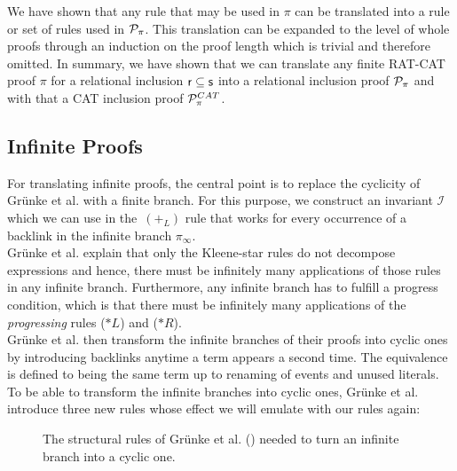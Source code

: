 \documentclass[a4paper,twoside,12pt, english]{article}
\begin{document}
We have shown that any rule that may be used in $\pi$ can be translated into a rule or set of rules used in $\mathcal{P}_\pi$. This translation can be expanded to the level of whole proofs through an induction on the proof length which is trivial and therefore omitted.
In summary, we have shown that we can translate any finite RAT-CAT proof $\pi$ for a relational inclusion $\textsf{\upshape r} \subseteq \textsf{\upshape s}$ into a relational inclusion proof $\mathcal{P}_\pi$ and with that a CAT inclusion proof $\mathcal{P}^{CAT}_\pi$.

\subsection{Infinite Proofs}\label{sec:infcompleteness}

For translating infinite proofs, the central point is to replace the cyclicity of Grünke et al. \cite{Gru+26} with a finite branch. For this purpose, we construct an invariant $\mathcal{I}$ which we can use in the~$(+_L)$ rule that works for every occurrence of a backlink in the infinite branch $\pi_\infty$.\\
Grünke et al. explain that only the Kleene-star rules do not decompose expressions and hence, there must be infinitely many applications of those rules in any infinite branch.
Furthermore, any infinite branch has to fulfill a progress condition, which is that there must be infinitely many applications of the \textit{progressing} rules ($*L$) and ($*R$). \\
Grünke et al. then transform the infinite branches of their proofs into cyclic ones by introducing backlinks anytime a term appears a second time. The equivalence is defined to being the same term up to renaming of events and unused literals. \\
To be able to transform the infinite branches into cyclic ones, Grünke et al. introduce three new rules whose effect we will emulate with our rules again:
\begin{figure}[h]
\caption{The structural rules of Grünke et al. (\cite{Gru+26}) needed to turn an infinite branch into a cyclic one.}\label{fig:structuralrules}
\end{figure}
\end{document}
